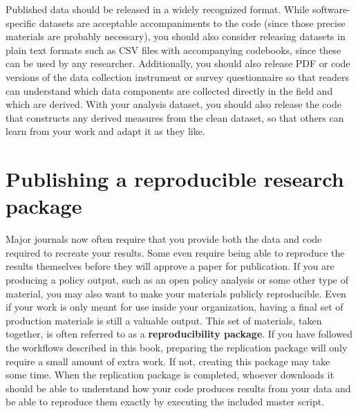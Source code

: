 Published data should be released in a widely recognized format.
While software-specific datasets are acceptable accompaniments to the code
(since those precise materials are probably necessary),
you should also consider releasing datasets in plain text formats
such as CSV files with accompanying codebooks,
since these can be used by any researcher.
Additionally, you should also release PDF or code versions of
the data collection instrument or survey questionnaire
so that readers can understand which data components are
collected directly in the field and which are derived.
With your analysis dataset,
you should also release the code
that constructs any derived measures
from the clean dataset,
so that others can learn from your work and adapt it as they like.

\section{Publishing a reproducible research package}

Major journals now often require that you provide both the data and code required to recreate your results.
Some even require being able to reproduce the results themselves
before they will approve a paper for publication.
If you are producing a policy output,
such as an open policy analysis
or some other type of material,
you may also want to make your materials publicly reproducible.
Even if your work is only meant for use inside your organization,
having a final set of production materials is still a valuable output.
This set of materials, taken together,
is often referred to as a \textbf{reproducibility package}.
If you have followed the workflows described in this book,
preparing the replication package will only require a small amount of extra work.
If not, creating this package may take some time.
When the replication package is completed,
whoever downloads it should be able
to understand how your code produces results from your data
and be able to reproduce them exactly by executing the included master script.

